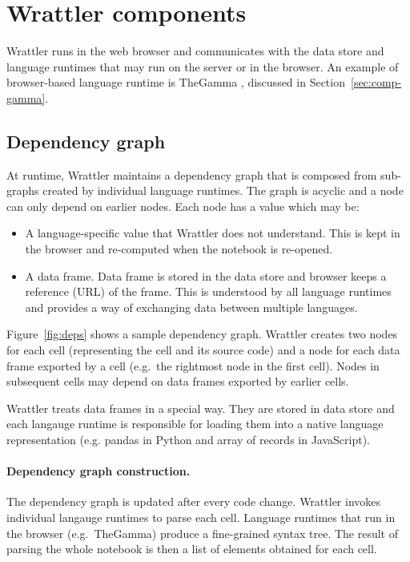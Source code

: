 \documentclass[sigplan]{acmart}\settopmatter{printfolios=true,printccs=false,printacmref=false}
\begin{document}
\section{Wrattler components}
\label{sec:comp}

Wrattler runs in the web browser and communicates with the data store and language runtimes
that may run on the server or in the browser. An example of browser-based language runtime is
TheGamma \cite{thegamma}, discussed in Section~\ref{sec:comp-gamma}.

\subsection{Dependency graph}
\label{sec:comp-deps}

At runtime, Wrattler maintains a dependency graph that is composed from sub-graphs
created by individual language runtimes. The graph is acyclic and a node can only depend on earlier 
nodes. Each node has a value which may be:
%
\begin{itemize}
\item A language-specific value that Wrattler does not understand. This is kept in the browser
  and re-computed when the notebook is re-opened.
\item A data frame. Data frame is stored in the data store and browser keeps a reference (URL) 
  of the frame. This is understood by all language runtimes and provides a way of exchanging
  data between multiple languages. 
\end{itemize}
%
Figure~\ref{fig:deps} shows a sample dependency graph. Wrattler creates two nodes for each cell
(representing the cell and its source code) and a node for each data frame exported by a cell 
(e.g.~the rightmost node in the first cell). Nodes in subsequent cells may depend on data frames
exported by earlier cells.

Wrattler treats data frames in a special way. They are stored in data store and each langauge 
runtime is responsible for loading them into a native language representation (e.g. pandas in 
Python and array of records in JavaScript). 

\paragraph{Dependency graph construction.} 
The dependency graph is updated after every code change. Wrattler invokes individual langauge 
runtimes to parse each cell. Language runtimes that run in the browser (e.g.~TheGamma) produce
a fine-grained syntax tree. The result of parsing the whole notebook is then a list of elements
obtained for each cell.
\end{document}
